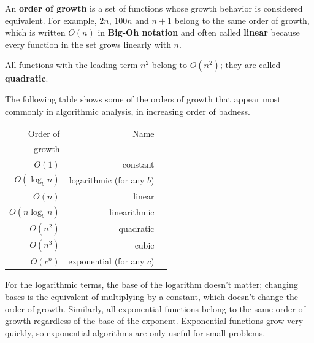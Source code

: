 \documentclass[10pt]{book}
\begin{document}
An {\bf order of growth} is a set of functions whose growth
behavior is considered equivalent.  For example, $2n$, $100n$ and $n+1$ 
belong to the same order of growth, which is written $O(n)$ in
{\bf Big-Oh notation} and often called {\bf linear} because every function
in the set grows linearly with $n$.

All functions with the leading term $n^2$ belong to $O(n^2)$; they are
called {\bf quadratic}.

The following table shows some of the orders of growth that
appear most commonly in algorithmic analysis,
in increasing order of badness.

\begin{tabular}{|r|r|r|}
\hline
Order of     &   Name      \\
growth       &               \\
\hline
$O(1)$             & constant \\
$O(\log_b n)$      & logarithmic (for any $b$) \\
$O(n)$             & linear \\
$O(n \log_b n)$    & linearithmic \\
$O(n^2)$           & quadratic     \\
$O(n^3)$           & cubic     \\
$O(c^n)$           & exponential (for any $c$)    \\
\hline
\end{tabular}

For the logarithmic terms, the base of the logarithm doesn't matter;
changing bases is the equivalent of multiplying by a constant, which
doesn't change the order of growth.  Similarly, all exponential
functions belong to the same order of growth regardless of the base of
the exponent.
Exponential functions grow very quickly, so exponential algorithms are
only useful for small problems.
\end{document}
